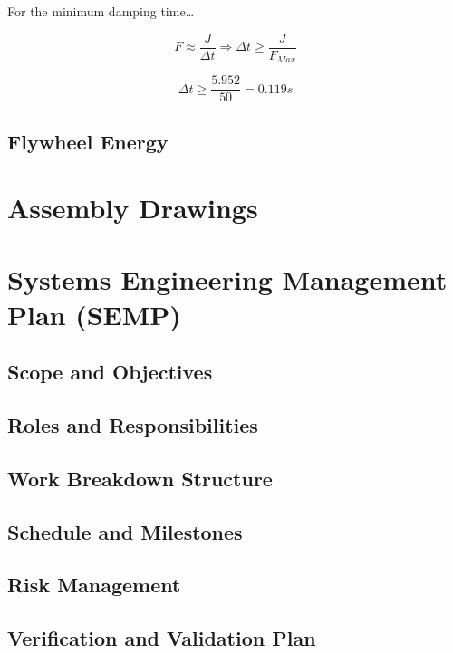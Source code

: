 \documentclass[a4paper,10pt]{article} %
\begin{document}
For the minimum damping time\ldots

\begin{equation*}
    F \approx \frac{J}{\Delta t} \Rightarrow \Delta t \geq \frac{J}{F_{Max}}
\end{equation*}

\begin{equation*}
    \Delta t \geq \frac{5.952}{50} = 0.119s
\end{equation*}

\newpage

\subsection{Flywheel Energy}

\newpage

\section{Assembly Drawings}

\newpage

\section{Systems Engineering Management Plan (SEMP)}

\subsection{Scope and Objectives}

\subsection{Roles and Responsibilities}

\subsection{Work Breakdown Structure}

\subsection{Schedule and Milestones}

\subsection{Risk Management}

\subsection{Verification and Validation Plan}
\end{document}
